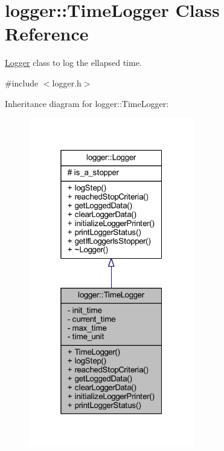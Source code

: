\hypertarget{classlogger_1_1_time_logger}{}\section{logger\+:\+:Time\+Logger Class Reference}
\label{classlogger_1_1_time_logger}


\mbox{\hyperlink{classlogger_1_1_logger}{Logger}} class to log the ellapsed time.  




{\ttfamily \#include $<$logger.\+h$>$}



Inheritance diagram for logger\+:\+:Time\+Logger\+:
\nopagebreak
\begin{figure}[H]
\begin{center}
\leavevmode
\includegraphics[width=205pt]{classlogger_1_1_time_logger__inherit__graph}
\end{center}
\end{figure}


